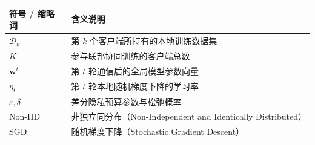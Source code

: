 
\begin{denotation}[主要符号表]
\noindent
\begin{tabularx}{\textwidth}{@{}>{\centering\arraybackslash}p{3.0cm} X@{}}
  \toprule
  符号 / 缩略词 & 含义说明 \\
  \midrule
  $\mathcal{D}_k$ & 第 $k$ 个客户端所持有的本地训练数据集 \\
  $K$             & 参与联邦协同训练的客户端总数 \\
  $\mathbf{w}^t$  & 第 $t$ 轮通信后的全局模型参数向量 \\
  $\eta_t$        & 第 $t$ 轮本地随机梯度下降的学习率 \\
  $\varepsilon, \delta$ & 差分隐私预算参数与松弛概率 \\
  Non-IID         & 非独立同分布（Non-Independent and Identically Distributed） \\
  SGD             & 随机梯度下降（Stochastic Gradient Descent） \\
  \bottomrule
\end{tabularx}
\end{denotation}
